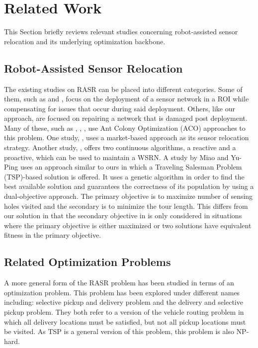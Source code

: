 \documentclass[conference]{IEEEtran}
\begin{document}
\section{Related Work}
\label{sec:RelatedWork}

This Section briefly reviews relevant studies concerning robot-assisted sensor relocation and 
its underlying optimization backbone.

\subsection{Robot-Assisted Sensor Relocation}
\label{sec:RelatedWork:RASR}

The existing studies on RASR can be placed into different categories. Some of them, such as \cite{fletcher2010back} and \cite{li2014placing}, focus on the deployment of a sensor network in a ROI while compensating for issues that occur during said deployment. Others, like our approach, are focused on repairing a network that is damaged post deployment. Many of these, such as \cite{wanglocalized}, \cite{caliskanelli2014using}, \cite{lian2012novel}, use Ant Colony Optimization (ACO) approaches to this problem. One study, \cite{li22market}, uses a market-based approach as its sensor relocation strategy. Another study, \cite{magklara2013node}, offers two continuous algorithms, a reactive and a proactive, which can be used to maintain a WSRN. A study by Miao and Yu-Ping \cite{miao2014coverage} uses an approach similar to ours in which a Traveling Salesman Problem (TSP)-based solution is offered. It uses a genetic algorithm in order to find the best available solution and guarantees the correctness of its population by using a dual-objective approach. The primary objective is to maximize number of sensing holes visited and the secondary is to minimize the tour length. This differs from our solution in that the secondary objective in \cite{miao2014coverage} is only considered in situations where the primary objective is either maximized or two solutions have equivalent fitness in the primary objective.

\subsection{Related Optimization Problems}
\label{sec:RelatedWork:Optimization}

A more general form of the RASR problem has been studied in terms of an optimization problem. This problem has been explored under different names including: selective pickup and delivery problem and the delivery and selective pickup problem. They both refer to a version of the vehicle routing problem in which all delivery locations must be satisfied, but not all pickup locations must be visited. As TSP is a general version of this problem, this problem is also NP-hard. 
\end{document}
